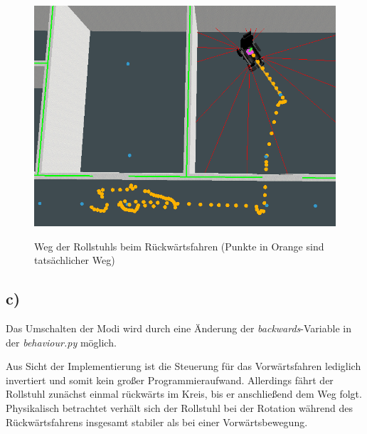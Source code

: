 \documentclass{../Vorlage/mat}
\begin{document}
\begin{figure}[!htbp]
\centering
\includegraphics[scale=0.3]{backwards}
\label{fig:aufgabe2b2}
\caption{Weg der Rollstuhls beim Rückwärtsfahren (Punkte in Orange sind tatsächlicher Weg)}

\end{figure}


\subsection*{c)}
Das Umschalten der Modi wird durch eine Änderung der \textit{backwards}-Variable in der \textit{behaviour.py} möglich.

Aus Sicht der Implementierung ist die Steuerung für das Vorwärtsfahren lediglich invertiert und somit kein großer Programmieraufwand. Allerdings fährt der Rollstuhl zunächst einmal rückwärts im Kreis, bis er anschließend dem Weg folgt.\\
Physikalisch betrachtet verhält sich der Rollstuhl bei der Rotation während des Rückwärtsfahrens insgesamt stabiler als bei einer Vorwärtsbewegung. 
\end{document}
